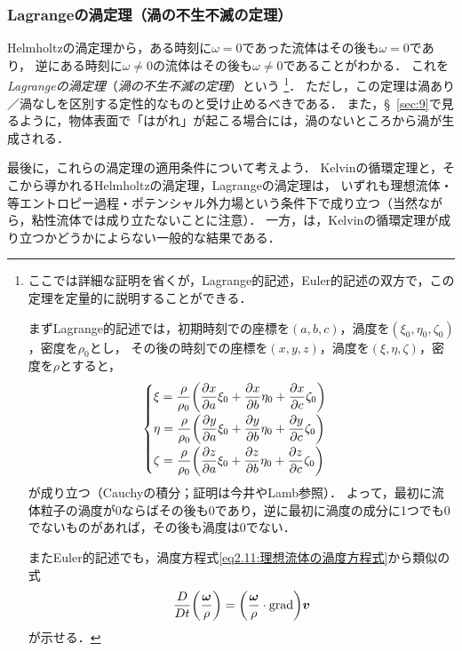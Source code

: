 

\subsubsection*{Lagrangeの渦定理（渦の不生不滅の定理）}

Helmholtzの渦定理から，ある時刻に$\omega=0$であった流体はその後も$\omega=0$であり，
逆にある時刻に$\omega\neq 0$の流体はその後も$\omega\neq 0$であることがわかる．
これを\emph{Lagrangeの渦定理}（\emph{渦の不生不滅の定理}）という
\footnote{
ここでは詳細な証明を省くが，Lagrange的記述，Euler的記述の双方で，この定理を定量的に説明することができる．

まずLagrange的記述では，初期時刻での座標を$(a,b,c)$，渦度を$(\xi_0,\eta_0,\zeta_0)$，密度を$\rho_0$とし，
その後の時刻での座標を$(x,y,z)$，渦度を$(\xi,\eta,\zeta)$，密度を$\rho$とすると，
\[
    \begin{cases}
        \xi = \dfrac{\rho}{\rho_0} \pqty{ \dpdv{x}{a} \xi_0 + \dpdv{x}{b} \eta_0 + \dpdv{x}{c} \zeta_0 } \\[7pt]
        \eta = \dfrac{\rho}{\rho_0} \pqty{ \dpdv{y}{a} \xi_0 + \dpdv{y}{b} \eta_0 + \dpdv{y}{c} \zeta_0 } \\[7pt]
        \zeta = \dfrac{\rho}{\rho_0} \pqty{ \dpdv{z}{a} \xi_0 + \dpdv{z}{b} \eta_0 + \dpdv{z}{c} \zeta_0 } \\
    \end{cases}
\]
が成り立つ（Cauchyの積分；証明は今井やLamb参照）．
よって，最初に流体粒子の渦度が0ならばその後も0であり，逆に最初に渦度の成分に1つでも0でないものがあれば，その後も渦度は0でない．


またEuler的記述でも，渦度方程式\eqref{eq2.11:理想流体の渦度方程式}から類似の式
\[
    \DDt{} \pqty{\frac{\vec{\omega}}{\rho}} = \pqty{ \frac{\vec{\omega}}{\rho} \cdot \Grad } \v
\]
が示せる．}．
ただし，この定理は渦あり／渦なしを区別する定性的なものと受け止めるべきである．
また，\S~\ref{sec:9}で見るように，物体表面で「はがれ」が起こる場合には，渦のないところから渦が生成される．




最後に，これらの渦定理の適用条件について考えよう．
Kelvinの循環定理と，そこから導かれるHelmholtzの渦定理，Lagrangeの渦定理は，
いずれも理想流体・等エントロピー過程・ポテンシャル外力場という条件下で成り立つ（当然ながら，粘性流体では成り立たないことに注意）．
一方，は，Kelvinの循環定理が成り立つかどうかによらない一般的な結果である．




